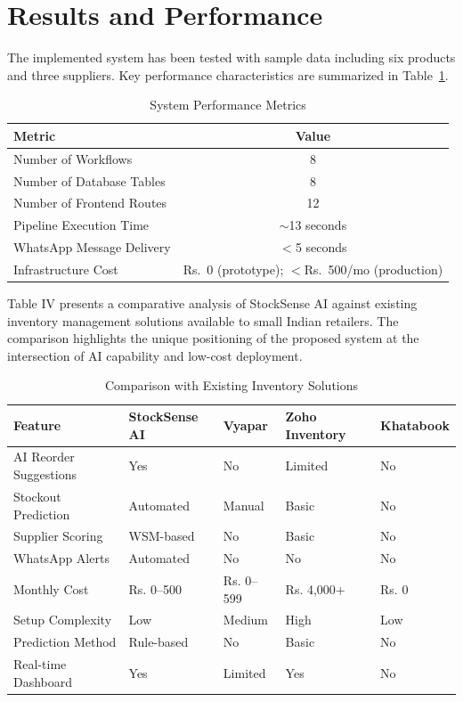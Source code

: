 \documentclass[journal]{IEEEtran}
\begin{document}
\section{Results and Performance}


The implemented system has been tested with sample data including six products and three suppliers. Key performance characteristics are summarized in Table~\ref{tab:perf}.

\begin{table}[htbp]
\centering
\caption{System Performance Metrics}
\label{tab:perf}
\begin{tabular}{lc}
\toprule
\textbf{Metric} & \textbf{Value} \\
\midrule
Number of Workflows & 8 \\
Number of Database Tables & 8 \\
Number of Frontend Routes & 12 \\
Pipeline Execution Time & $\sim$13 seconds \\
WhatsApp Message Delivery & $<$5 seconds \\
Infrastructure Cost & Rs.\ 0 (prototype); $<$Rs.\ 500/mo (production) \\
\bottomrule
\end{tabular}
\end{table}

Table IV presents a comparative analysis of StockSense AI 
against existing inventory management solutions available 
to small Indian retailers. The comparison highlights the 
unique positioning of the proposed system at the 
intersection of AI capability and low-cost deployment.

\begin{table}[htbp]
\centering
\caption{Comparison with Existing Inventory Solutions}
\label{tab:comparison}
\renewcommand{\arraystretch}{1.4}
\begin{tabularx}{\columnwidth}{lXXXX}
\toprule
\textbf{Feature} & \textbf{StockSense AI} & \textbf{Vyapar} & \textbf{Zoho Inventory} & \textbf{Khatabook} \\
\midrule
AI Reorder Suggestions & Yes & No & Limited & No \\
Stockout Prediction & Automated & Manual & Basic & No \\
Supplier Scoring & WSM-based & No & Basic & No \\
WhatsApp Alerts & Automated & No & No & No \\
Monthly Cost & Rs. 0--500 & Rs. 0--599 & Rs. 4,000+ & Rs. 0 \\
Setup Complexity & Low & Medium & High & Low \\
Prediction Method & Rule-based & No & Basic & No \\
Real-time Dashboard & Yes & Limited & Yes & No \\
\bottomrule
\end{tabularx}
\end{table}
\end{document}
